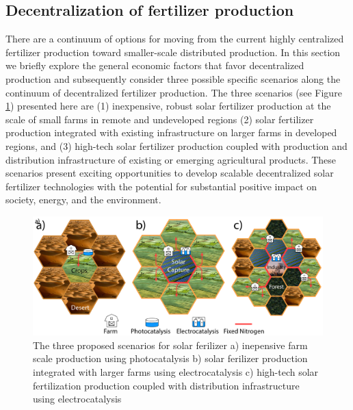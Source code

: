 \subsection{Decentralization of fertilizer production}
\label{sec:decentralized}

There are a continuum of options for moving from the current highly centralized fertilizer production toward smaller-scale distributed production. In this section we briefly explore the general economic factors that favor decentralized production and subsequently consider three possible specific scenarios along the continuum of decentralized fertilizer production.
The three scenarios (see Figure \ref{fig:scenarios}) presented here are (1) inexpensive, robust solar fertilizer production at the scale of small farms in remote and undeveloped regions (2) solar fertilizer production integrated with existing infrastructure on larger farms in developed regions, and (3) high-tech solar fertilizer production coupled with production and distribution infrastructure of existing or emerging agricultural products. These scenarios present exciting opportunities to develop scalable decentralized solar fertilizer technologies with the potential for substantial positive impact on society, energy, and the environment.

\begin{figure}
    \centering
    \includegraphics[width=\textwidth]{Figures/solar_fertilizer_scenarios.pdf}
    \caption{The three proposed scenarios for solar ferilizer a) inepensive farm scale production using photocatalysis b) solar ferilizer production integrated with larger farms using electrocatalysis c) high-tech solar fertilization production coupled with distribution infrastructure using electrocatalysis}
    \label{fig:scenarios}
\end{figure}

